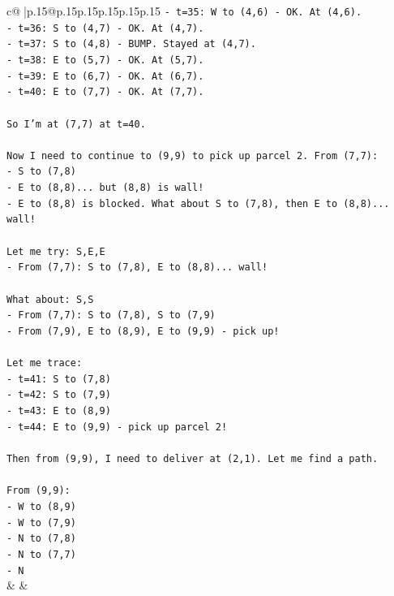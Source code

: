 \documentclass{article}
\begin{document}
{\begin{supertabular}{c@{$\;$}|p{.15\linewidth}@{}p{.15\linewidth}p{.15\linewidth}p{.15\linewidth}p{.15\linewidth}p{.15\linewidth}}
{{{\texttt{{-} t=35: W to (4,6) {-} OK. At (4,6).} \\
\texttt{{-} t=36: S to (4,7) {-} OK. At (4,7).} \\
\texttt{{-} t=37: S to (4,8) {-} BUMP. Stayed at (4,7).} \\
\texttt{{-} t=38: E to (5,7) {-} OK. At (5,7).} \\
\texttt{{-} t=39: E to (6,7) {-} OK. At (6,7).} \\
\texttt{{-} t=40: E to (7,7) {-} OK. At (7,7).} \\
\\ 
\texttt{So I'm at (7,7) at t=40.} \\
\\ 
\texttt{Now I need to continue to (9,9) to pick up parcel 2. From (7,7):} \\
\texttt{{-} S to (7,8)} \\
\texttt{{-} E to (8,8)... but (8,8) is wall!} \\
\texttt{{-} E to (8,8) is blocked. What about S to (7,8), then E to (8,8)... wall!} \\
\\ 
\texttt{Let me try: S,E,E} \\
\texttt{{-} From (7,7): S to (7,8), E to (8,8)... wall!} \\
\\ 
\texttt{What about: S,S} \\
\texttt{{-} From (7,7): S to (7,8), S to (7,9)} \\
\texttt{{-} From (7,9), E to (8,9), E to (9,9) {-} pick up!} \\
\\ 
\texttt{Let me trace:} \\
\texttt{{-} t=41: S to (7,8)} \\
\texttt{{-} t=42: S to (7,9)} \\
\texttt{{-} t=43: E to (8,9)} \\
\texttt{{-} t=44: E to (9,9) {-} pick up parcel 2!} \\
\\ 
\texttt{Then from (9,9), I need to deliver at (2,1). Let me find a path.} \\
\\ 
\texttt{From (9,9):} \\
\texttt{{-} W to (8,9)} \\
\texttt{{-} W to (7,9)} \\
\texttt{{-} N to (7,8)} \\
\texttt{{-} N to (7,7)} \\
\texttt{{-} N} \\
            }
        }
    }
    & & \\ \\


\end{supertabular}}
\end{document}
